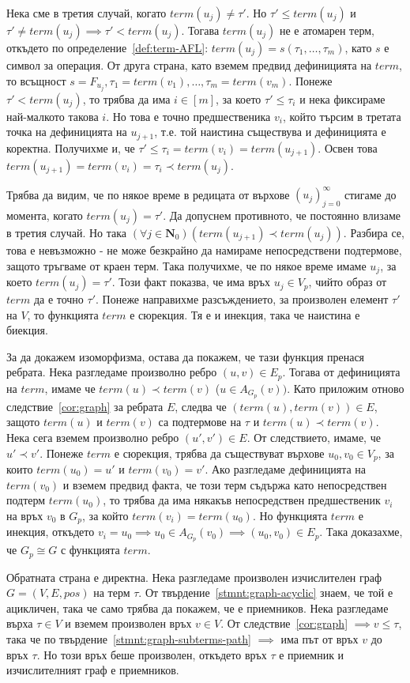 \documentclass[12pt,twoside,a4paper]{article}
\begin{document}
\begin{statement}
		Нека сме в третия случай, когато $term(u_j) \neq \tau'$. Но $\tau' \leq term(u_j)$ и $\tau' \neq term(u_j) \implies \tau' < term(u_j)$. Тогава $term(u_j)$ не е атомарен терм, откъдето по определение~\ref{def:term-AFL}: $term(u_j) = s(\tau_1, \dots, \tau_m)$, като $s$ е символ за операция. От друга страна, като вземем предвид дефиницията на $term$, то всъщност $s=F_{u_j}, \tau_1 = term(v_1), \dots, \tau_m = term(v_m)$. Понеже $\tau' < term(u_j)$, то трябва да има $i \in [m]$, за което $\tau' \leq \tau_i$ и нека фиксираме най-малкото такова $i$. Но това е точно предшественика $v_i$, който търсим в третата точка на дефиницията на $u_{j+1}$, т.е. той наистина съществува и дефиницията е коректна. Получихме и, че $\tau' \leq \tau_i = term(v_i) = term(u_{j+1})$. Освен това $term(u_{j+1})=term(v_i)=\tau_i \prec term(u_j)$.
		
		Трябва да видим, че по някое време в редицата от върхове $(u_j)_{j=0}^\infty$ стигаме до момента, когато $term(u_j) = \tau'$. Да допуснем противното, че постоянно влизаме в третия случай. Но така $(\forall j \in \mathbf{N}_0)(term(u_{j+1}) \prec term(u_j))$. Разбира се, това е невъзможно - не може безкрайно да намираме непосредствени подтермове, защото тръгваме от краен терм. Така получихме, че по някое време имаме $u_j$, за което $term(u_j) = \tau'$. Този факт показва, че има връх $u_j \in V_p$, чийто образ от $term$ да е точно $\tau'$. Понеже направихме разсъждението, за произволен елемент $\tau'$ на $V$, то функцията $term$ е сюрекция. Тя е и инекция, така че наистина е биекция.
		
		За да докажем изоморфизма, остава да покажем, че тази функция пренася ребрата. Нека разгледаме произволно ребро $(u,v) \in E_p$. Тогава от дефиницията на $term$, имаме че $term(u) \prec term(v)$ ($u \in A_{G_p}(v))$. Като приложим отново следствие~\ref{cor:graph} за ребрата $E$, следва че $(term(u), term(v)) \in E$, защото $term(u)$ и $term(v)$ са подтермове на $\tau$ и $term(u) \prec term(v)$. Нека сега вземем произволно ребро $(u',v') \in E$. От следствието, имаме, че $u' \prec v'$. Понеже $term$ е сюрекция, трябва да съществуват върхове $u_0, v_0 \in V_p$, за които $term(u_0)=u'$ и $term(v_0)=v'$. Ако разгледаме дефиницията на $term(v_0)$ и вземем предвид факта, че този терм съдържа като непосредствен подтерм $term(u_0)$, то трябва да има някакъв непосредствен предшественик $v_i$ на връх $v_0$ в $G_p$, за който $term(v_i)=term(u_0)$. Но функцията $term$ е инекция, откъдето $v_i=u_0 \implies u_0 \in A_{G_p}(v_0) \implies (u_0, v_0) \in E_p$. Така доказахме, че $G_p \cong G$ с функцията $term$.
		
		Обратната страна е директна. Нека разгледаме произволен изчислителен граф $G=(V,E,pos)$ на терм $\tau$. От твърдение~\ref{stmnt:graph-acyclic} знаем, че той е ацикличен, така че само трябва да покажем, че е приемников. Нека разгледаме върха $\tau \in V$ и вземем произволен връх $v \in V$. От следствие~\ref{cor:graph} $\implies v \le \tau$, така че по твърдение~\ref{stmnt:graph-subterms-path} $\implies$ има път от връх $v$ до връх $\tau$. Но този връх беше произволен, откъдето връх $\tau$ е приемник и изчислителният граф е приемников.
	\end{statement}
	
\end{document}

